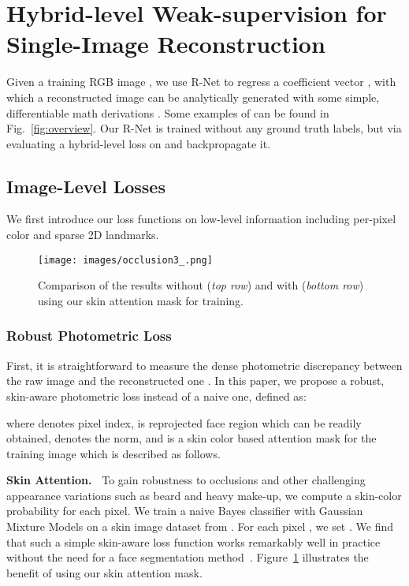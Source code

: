\documentclass[10pt,twocolumn,letterpaper]{article}
\begin{document}
\section{Hybrid-level Weak-supervision for Single-Image Reconstruction}\label{sec:hyrid}

Given a training RGB image , we use R-Net to regress a coefficient vector , with which a reconstructed image  can be analytically generated with some simple, differentiable math derivations
. Some examples of  can be found in Fig.~\ref{fig:overview}. Our R-Net is trained without any ground truth labels, but via evaluating a hybrid-level loss on  and backpropagate it.

\subsection{Image-Level Losses}

We first introduce our loss functions on low-level information including per-pixel color and sparse 2D landmarks.

\begin{figure}[t!]
	\texttt{[image: images/occlusion3\_.png]}
	\caption{Comparison of the results without (\emph{top row}) and with (\emph{bottom row}) using our skin attention mask for training.}\label{fig:mask}
\end{figure}

\subsubsection{Robust Photometric Loss}
First, it is straightforward to measure the dense photometric discrepancy between the raw image and the reconstructed one \cite{blanz1999morphable,thies2016face2face,tewari2017mofa,tewari2018self}. In this paper, we propose a robust, skin-aware photometric loss instead of a naive one, defined as:

where  denotes pixel index,  is reprojected face region which can be readily obtained,  denotes the  norm, and  is a skin color based attention mask for the training image which is described as follows.

\vspace{6pt}
\noindent\textbf{Skin Attention.~} To gain robustness to occlusions and other challenging appearance variations such as beard and heavy make-up, we compute a skin-color probability  for each pixel. We train a naive Bayes classifier with Gaussian Mixture Models on a skin image dataset from \cite{jones2002statistical}
. For each pixel , we set
 {\footnotesize .}
We find that such a simple skin-aware loss function works remarkably well in practice without the need for a face segmentation method~\cite{saito2016real}. Figure~\ref{fig:mask} illustrates the benefit of using our skin attention mask.
\end{document}

